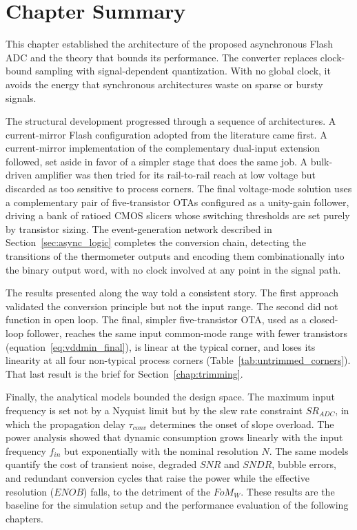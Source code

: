 \section{Chapter Summary}
\label{subsec:chapter_summary}

This chapter established the architecture of the proposed asynchronous Flash ADC and the theory that bounds its performance. The converter replaces clock-bound sampling with signal-dependent quantization. With no global clock, it avoids the energy that synchronous architectures waste on sparse or bursty signals.

The structural development progressed through a sequence of architectures. A current-mirror Flash configuration adopted from the literature came first. A current-mirror implementation of the complementary dual-input extension followed, set aside in favor of a simpler stage that does the same job. A bulk-driven amplifier was then tried for its rail-to-rail reach at low voltage but discarded as too sensitive to process corners. The final voltage-mode solution uses a complementary pair of five-transistor OTAs configured as a unity-gain follower, driving a bank of ratioed CMOS slicers whose switching thresholds are set purely by transistor sizing. The event-generation network described in Section~\ref{sec:async_logic} completes the conversion chain, detecting the transitions of the thermometer outputs and encoding them combinationally into the binary output word, with no clock involved at any point in the signal path.

The results presented along the way told a consistent story. The first approach validated the conversion principle but not the input range. The second did not function in open loop. The final, simpler five-transistor OTA, used as a closed-loop follower, reaches the same input common-mode range with fewer transistors (equation~\eqref{eq:vddmin_final}), is linear at the typical corner, and loses its linearity at all four non-typical process corners (Table~\ref{tab:untrimmed_corners}). That last result is the brief for Section~\ref{chap:trimming}.

Finally, the analytical models bounded the design space. The maximum input frequency is set not by a Nyquist limit but by the slew rate constraint $SR_{ADC}$, in which the propagation delay $\tau_{conv}$ determines the onset of slope overload. The power analysis showed that dynamic consumption grows linearly with the input frequency $f_{in}$ but exponentially with the nominal resolution $N$. The same models quantify the cost of transient noise, degraded $SNR$ and $SNDR$, bubble errors, and redundant conversion cycles that raise the power while the effective resolution ($ENOB$) falls, to the detriment of the $FoM_W$. These results are the baseline for the simulation setup and the performance evaluation of the following chapters.

